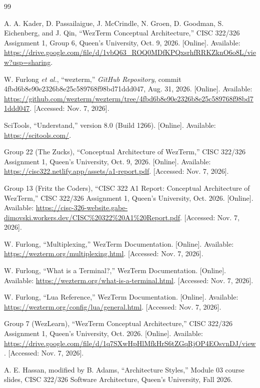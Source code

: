 \begin{thebibliography}{99}

A. A. Kader, D. Passailaigue, J. McCrindle, N. Groen, D. Goodman, S. Eichenberg, and J. Qin,
``WezTerm Conceptual Architecture,'' CISC 322/326 Assignment 1, Group 6, Queen's University, Oct. 9, 2026.
[Online]. Available: \url{https://drive.google.com/file/d/1vbQ63_ROQ0MDfKPQxsrhfRRKZknO6o8L/view?usp=sharing}.

W. Furlong \emph{et al.}, ``wezterm,'' \emph{GitHub Repository}, commit 4fbd6b8e90e2326b8e25c589768f98bd71ddd047, Aug. 31, 2026.
[Online]. Available: \url{https://github.com/wezterm/wezterm/tree/4fbd6b8e90e2326b8e25c589768f98bd71ddd047}.
[Accessed: Nov. 7, 2026].

SciTools, ``Understand,'' version 8.0 (Build 1266).
[Online]. Available: \url{https://scitools.com/}.

Group 22 (The Zucks), ``Conceptual Architecture of WezTerm,'' CISC 322/326 Assignment 1, Queen's University, Oct. 9, 2026.
[Online]. Available: \url{https://cisc322.netlify.app/assets/a1-report.pdf}.
[Accessed: Nov. 7, 2026].

Group 13 (Fritz the Coders), ``CISC 322 A1 Report: Conceptual Architecture of WezTerm,'' CISC 322/326 Assignment 1, Queen's University, Oct. 2026.
[Online]. Available: \url{https://cisc-326-website.gabe-dimovski.workers.dev/CISC%20322%20A1%20Report.pdf}.
[Accessed: Nov. 7, 2026].

W. Furlong, ``Multiplexing,'' WezTerm Documentation.
[Online]. Available: \url{https://wezterm.org/multiplexing.html}.
[Accessed: Nov. 7, 2026].

W. Furlong, ``What is a Terminal?,'' WezTerm Documentation.
[Online]. Available: \url{https://wezterm.org/what-is-a-terminal.html}.
[Accessed: Nov. 7, 2026].

W. Furlong, ``Lua Reference,'' WezTerm Documentation.
[Online]. Available: \url{https://wezterm.org/config/lua/general.html}.
[Accessed: Nov. 7, 2026].

Group 7 (WezLearn), ``WezTerm Conceptual Architecture,'' CISC 322/326 Assignment 1, Queen's University, Oct. 2026.
[Online]. Available: \url{https://drive.google.com/file/d/1q7SXwHpHlMfkHrS6tZGqRjOP4EOsvnDJ/view}.
[Accessed: Nov. 7, 2026].

A. E. Hassan, modified by B. Adams, ``Architecture Styles,'' Module 03 course slides, CISC 322/326 Software Architecture, Queen's University, Fall 2026.


\end{thebibliography}
